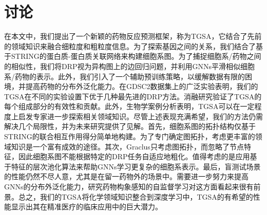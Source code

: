 \section{讨论}
在本文中，我们提出了一个新颖的药物反应预测框架，称为TGSA，它结合了先前的领域知识来融合细粒度和粗粒度信息。为了探索基因之间的关系，我们结合了基于STRING的蛋白质-蛋白质关联网络来构建细胞系图。为了捕捉细胞系/药物之间的相似性，我们将DRP视为异构图上的边回归问题，并利用GNNs平滑相似细胞系/药物的表示。此外，我们引入了一个辅助预训练策略，以缓解数据有限的困境，并提高药物的分布外泛化能力。在GDSC2数据集上的广泛实验表明，我们的TGSA在不同的实验设置下优于几种最先进的DRP方法。消融研究验证了TGSA的每个组成部分的有效性和贡献。此外，生物学案例分析表明，TGSA可以在一定程度上启发专家进一步探索相关领域知识。尽管上述表现充满希望，我们的方法仍需解决几个局限性，并为未来研究提供了见解。首先，细胞系图的拓扑结构仅基于STRING的联合相互作用得分简单地构建。为了专门确定图拓扑，考虑更丰富的领域知识是一个富有成效的途径。其次，Graclus只考虑图拓扑，而忽略了节点特征\cite{Bianchi2020}，因此细胞系图不能根据特定的DRP任务自适应地粗化。值得考虑的是应用基于特征的层次池化算法来帮助GNNs学习更复杂的细胞系表示。最后，盲测试场景的性能仍然不尽人意，尤其是在留一药物外的场景中。需要进一步努力来提高GNNs的分布外泛化能力，研究药物构象感知的自监督学习对这方面看起来很有前景。总之，我们的TGSA将化学领域知识整合到深度学习中，TGSA的有希望的性能显示出其在精准医疗的临床应用中的巨大潜力。

\begingroup
    \printbibliography[title={外文翻译参考文献}]
\endgroup
